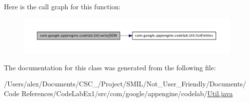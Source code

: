 Here is the call graph for this function\-:
\nopagebreak
\begin{figure}[H]
\begin{center}
\leavevmode
\includegraphics[width=350pt]{classcom_1_1google_1_1appengine_1_1codelab_1_1_util_a1166a7fd8ba0cbbd491a3aa68556bf1d_cgraph}
\end{center}
\end{figure}




The documentation for this class was generated from the following file\-:\begin{DoxyCompactItemize}
\item 
/\-Users/alex/\-Documents/\-C\-S\-C\-\_/\-Project/\-S\-M\-I\-L/\-Not\-\_\-\-User\-\_\-\-Friendly/\-Documents/\-Code References/\-Code\-Lab\-Ex1/src/com/google/appengine/codelab/\hyperlink{_documents_2_code_01_references_2_code_lab_ex1_2src_2com_2google_2appengine_2codelab_2_util_8java}{Util.\-java}\end{DoxyCompactItemize}
